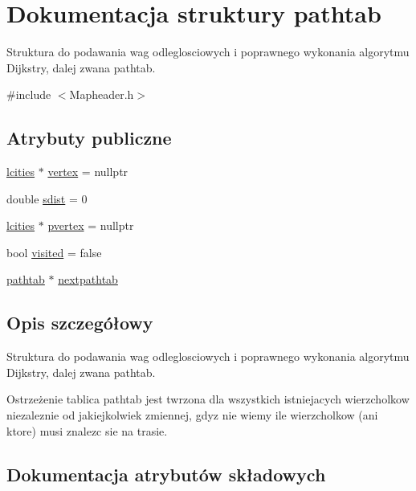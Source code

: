 \hypertarget{structpathtab}{}\section{Dokumentacja struktury pathtab}
\label{structpathtab}


Struktura do podawania wag odleglosciowych i poprawnego wykonania algorytmu Dijkstry, dalej zwana pathtab.  




{\ttfamily \#include $<$Mapheader.\+h$>$}

\subsection*{Atrybuty publiczne}
\begin{DoxyCompactItemize}
\item 
\mbox{\hyperlink{structlcities}{lcities}} $\ast$ \mbox{\hyperlink{structpathtab_a4d32b8ede66958e9599e773e754b5027}{vertex}} = nullptr
\item 
double \mbox{\hyperlink{structpathtab_afdbd8fb4a4437e60b836f4623523d640}{sdist}} = 0
\item 
\mbox{\hyperlink{structlcities}{lcities}} $\ast$ \mbox{\hyperlink{structpathtab_abccdc514a1353a851fa47bbc9afcdc5e}{pvertex}} = nullptr
\item 
bool \mbox{\hyperlink{structpathtab_a2af2d9ba6f3cff245e1f569e72ef43ff}{visited}} = false
\item 
\mbox{\hyperlink{structpathtab}{pathtab}} $\ast$ \mbox{\hyperlink{structpathtab_a34941d031d8f7809f84e8c7017ecbcbb}{nextpathtab}}
\end{DoxyCompactItemize}


\subsection{Opis szczegółowy}
Struktura do podawania wag odleglosciowych i poprawnego wykonania algorytmu Dijkstry, dalej zwana pathtab. 

\begin{DoxyWarning}{Ostrzeżenie}
tablica pathtab jest twrzona dla wszystkich istniejacych wierzcholkow niezaleznie od jakiejkolwiek zmiennej, gdyz nie wiemy ile wierzcholkow (ani ktore) musi znalezc sie na trasie. 
\end{DoxyWarning}


\subsection{Dokumentacja atrybutów składowych}
\mbox{\label{structpathtab_a34941d031d8f7809f84e8c7017ecbcbb}} 
